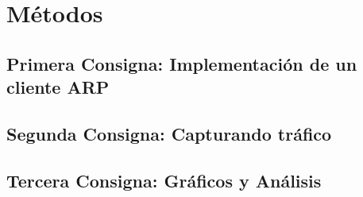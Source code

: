 \section{M\'etodos}


\subsection{Primera Consigna: Implementaci\'on de un cliente ARP}

\subsection{Segunda Consigna: Capturando tr\'afico}

\subsection{Tercera Consigna: Gr\'aficos y An\'alisis}

